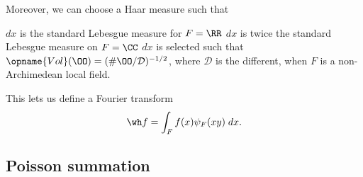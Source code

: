 Moreover, we can choose a Haar measure such that
\begin{itemize}
  \ii $dx$ is the standard Lebesgue measure for $F = \RR$
  \ii $dx$ is twice the standard Lebesgue measure on $F = \CC$
  \ii $dx$ is selected such that $\opname{Vol}(\OO) = (\#\OO/\mathcal D)^{-1/2}$,
  where $\mathcal D$ is the different,
  when $F$ is a non-Archimedean local field.
\end{itemize}

This lets us define a Fourier transform
\[ \wh f = \int_F f(x) \psi_F(xy) \; dx. \]

\subsection{Poisson summation}
